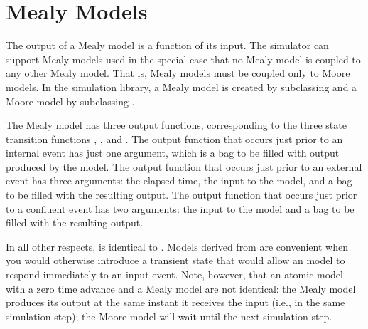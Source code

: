 \chapter{Mealy Models}
\label{chapter:mealy_models}

The output of a Mealy model is a function of its input. The simulator can support Mealy models used in the special case that no Mealy model is coupled to any other Mealy model. That is, Mealy models must be coupled only to Moore models. In the simulation library, a Mealy model is created by subclassing  and a Moore model by subclassing .

The Mealy model has three output functions, corresponding to the three state transition functions , , and . The output function that occurs just prior to an internal event has just one argument, which is a bag to be filled with output produced by the model. The output function that occurs just prior to an external event has three arguments: the elapsed time, the input to the model, and a bag to be filled with the resulting output. The output function that occurs just prior to a confluent event has two arguments: the input to the model and a bag to be filled with the resulting output. 

In all other respects,  is identical to . Models derived from  are convenient when you would otherwise introduce a transient state that would allow an  model to respond immediately to an input event. Note, however, that an atomic model with a zero time advance and a Mealy model are not identical: the Mealy model produces its output at the same instant it receives the input (i.e., in the same simulation step); the Moore model will wait until the next simulation step.


